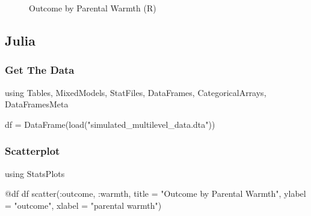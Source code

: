 \documentclass[
  letterpaper,
  DIV=11,
  numbers=noendperiod]{scrreprt}
\newenvironment{Shaded}{\begin{snugshade}}{\end{snugshade}}
\newcommand{\BuiltInTok}[1]{\textcolor[rgb]{0.00,0.23,0.31}{#1}}
\newcommand{\FunctionTok}[1]{\textcolor[rgb]{0.28,0.35,0.67}{#1}}
\newcommand{\ImportTok}[1]{\textcolor[rgb]{0.00,0.46,0.62}{#1}}
\newcommand{\NormalTok}[1]{\textcolor[rgb]{0.00,0.23,0.31}{#1}}
\newcommand{\OperatorTok}[1]{\textcolor[rgb]{0.37,0.37,0.37}{#1}}
\newcommand{\PreprocessorTok}[1]{\textcolor[rgb]{0.68,0.00,0.00}{#1}}
\newcommand{\StringTok}[1]{\textcolor[rgb]{0.13,0.47,0.30}{#1}}
\begin{document}
\begin{figure}[H]


\caption{\label{fig-R}Outcome by Parental Warmth (R)}

\end{figure}%

\subsection{Julia}

\subsubsection{Get The Data}\label{get-the-data-2}

\begin{Shaded}
\begin{Highlighting}[]
\ImportTok{using} \BuiltInTok{Tables}\NormalTok{, }\BuiltInTok{MixedModels}\NormalTok{, }\BuiltInTok{StatFiles}\NormalTok{, }\BuiltInTok{DataFrames}\NormalTok{, }\BuiltInTok{CategoricalArrays}\NormalTok{, }\BuiltInTok{DataFramesMeta}

\NormalTok{df }\OperatorTok{=} \FunctionTok{DataFrame}\NormalTok{(}\FunctionTok{load}\NormalTok{(}\StringTok{"simulated\_multilevel\_data.dta"}\NormalTok{))}
\end{Highlighting}
\end{Shaded}

\subsubsection{Scatterplot}\label{scatterplot-2}

\begin{Shaded}
\begin{Highlighting}[]
\ImportTok{using} \BuiltInTok{StatsPlots}

\PreprocessorTok{@df}\NormalTok{ df }\FunctionTok{scatter}\NormalTok{(}\OperatorTok{:}\NormalTok{outcome, }\OperatorTok{:}\NormalTok{warmth, }
\NormalTok{               title }\OperatorTok{=} \StringTok{"Outcome by Parental Warmth"}\NormalTok{,}
\NormalTok{               ylabel }\OperatorTok{=} \StringTok{"outcome"}\NormalTok{,}
\NormalTok{               xlabel }\OperatorTok{=} \StringTok{"parental warmth"}\NormalTok{)}
\end{Highlighting}
\end{Shaded}
\end{document}
